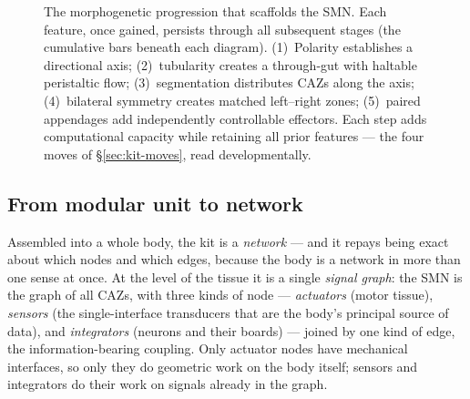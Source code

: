 \documentclass{article}
\begin{document}
\begin{figure}[!htbp]
\caption{The morphogenetic progression that scaffolds the SMN.  Each
feature, once gained, persists through all subsequent stages (the
cumulative bars beneath each diagram).  (1)~Polarity establishes a
directional axis; (2)~tubularity creates a through-gut with haltable
peristaltic flow; (3)~segmentation distributes CAZs along the axis;
(4)~bilateral symmetry creates matched left--right zones;
(5)~paired appendages add independently controllable effectors.  Each
step adds computational capacity while retaining all prior features
--- the four moves of \S\ref{sec:kit-moves}, read developmentally.}
\label{fig:morphogenetic-progression}
\end{figure}

\subsection{From modular unit to network}\label{sec:kit-network}

Assembled into a whole body, the kit is a \emph{network} --- and it repays being
exact about which nodes and which edges, because the body is a network in more
than one sense at once.  At the level of the tissue it is a single \emph{signal
graph}: the SMN is the graph of all CAZs, with three kinds of node ---
\emph{actuators} (motor tissue), \emph{sensors} (the single-interface transducers
that are the body's principal source of data), and \emph{integrators} (neurons and
their boards) --- joined by one kind of edge, the information-bearing coupling.
Only actuator nodes have mechanical interfaces, so only they do geometric work on
the body itself; sensors and integrators do their work on signals already in the
graph.
\end{document}
